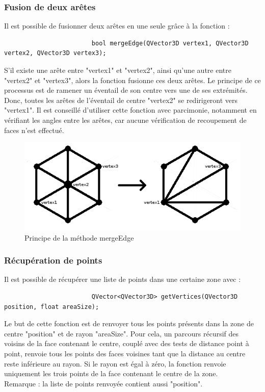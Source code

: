 \documentclass[a4paper]{memoir}
\begin{document}
				\subsubsection{Fusion de deux arêtes}
					Il est possible de fusionner deux arêtes en une seule grâce à la fonction :
					\begin{verbatim}
						bool mergeEdge(QVector3D vertex1, QVector3D vertex2, QVector3D vertex3);
					\end{verbatim}
					S'il existe une arête entre "vertex1" et "vertex2", ainsi qu'une autre entre "vertex2" et "vertex3", alors la fonction fusionne ces deux 
					arêtes. Le principe de ce processus est de ramener un éventail de son centre vers une de ses extrémités. Donc, toutes les arêtes de 
					l'éventail de centre "vertex2" se redirigeront vers "vertex1". Il est conseillé d'utiliser cette fonction avec parcimonie, notamment en 
					vérifiant les angles entre les arêtes, car aucune vérification de recoupement de faces n'est effectué.
					\begin{figure}[H]
						\begin{center}
							\includegraphics[scale=0.55]{img/mergeEdge.png}
							\caption{Principe de la méthode mergeEdge}
						\end{center}
					\end{figure}
					
				\subsubsection{Récupération de points}
					Il est possible de récupérer une liste de points dans une certaine zone avec :
					\begin{verbatim}
						QVector<QVector3D> getVertices(QVector3D position, float areaSize);
					\end{verbatim}
					Le but de cette fonction est de renvoyer tous les points présents dans la zone de centre "position" et de rayon "areaSize". Pour cela, 
					un parcours récursif des voisins de la face contenant le centre, couplé avec des tests de distance point à point, renvoie tous les 
					points des faces voisines tant que la distance au centre reste inférieure au rayon. Si le rayon est égal à zéro, la fonction renvoie 
					uniquement les trois points de la face contenant le centre de la zone.\\ 
					Remarque : la liste de points renvoyée contient aussi "position".
					
\end{document}
